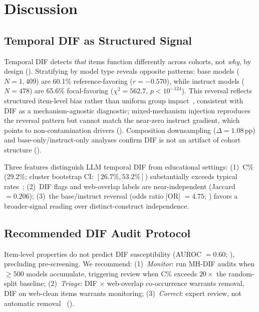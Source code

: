 \section{Discussion}
\label{sec:discussion}

\subsection{Temporal DIF as Structured Signal}
\label{sec:disc_temporal}

Temporal DIF detects \emph{that} items function differently across cohorts, not \emph{why}, by design (). Stratifying by model type reveals opposite patterns: base models ($N{=}1{,}409$) are 60.1\% reference-favoring ($r = -0.570$), while instruct models ($N{=}478$) are 65.6\% focal-favoring ($\chi^2 = 562.7$, $p < 10^{-124}$). This reversal reflects structured item-level bias rather than uniform group impact~\citep{camilli1994methods}, consistent with DIF as a mechanism-agnostic diagnostic; mixed-mechanism injection reproduces the reversal pattern but cannot match the near-zero instruct gradient, which points to non-contamination drivers (). Composition downsampling ($\Delta = 1.08$\,pp) and base-only/instruct-only analyses confirm DIF is not an artifact of cohort structure ().

Three features distinguish LLM temporal DIF from educational settings: (1)~C\% (29.2\%; cluster bootstrap CI: $[26.7\%, 53.2\%]$) substantially exceeds typical rates~\citep{clauser1998dif}; (2)~DIF flags and web-overlap labels are near-independent (Jaccard $= 0.206$); (3)~the base/instruct reversal (odds ratio [OR] $= 4.75$; ) favors a broader-signal reading over distinct-construct independence.

\subsection{Recommended DIF Audit Protocol}
\label{sec:disc_protocol}

Item-level properties do not predict DIF susceptibility (AUROC $= 0.60$; ), precluding pre-screening. We recommend: (1)~\emph{Monitor}: run MH-DIF audits when ${\geq}$500 models accumulate, triggering review when C\% exceeds $20\times$ the random-split baseline; (2)~\emph{Triage}: DIF $\times$ web-overlap co-occurrence warrants removal, DIF on web-clean items warrants monitoring; (3)~\emph{Correct}: expert review, not automatic removal~\citep{camilli1994methods,penfield2007dif} ().
